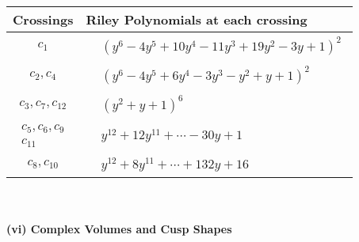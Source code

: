 \documentclass[1p]{elsarticle_modified}
\theoremstyle{definition}
\begin{document}
\begin{tabular}{m{50pt}|m{274pt}}
Crossings & \hspace{64pt}Riley Polynomials at each crossing \\
\hline $$\begin{aligned}c_{1}\end{aligned}$$&$\begin{aligned}
&(y^6-4 y^5+10 y^4-11 y^3+19 y^2-3 y+1)^2
\end{aligned}$\\
\hline $$\begin{aligned}c_{2},c_{4}\end{aligned}$$&$\begin{aligned}
&(y^6-4 y^5+6 y^4-3 y^3- y^2+y+1)^2
\end{aligned}$\\
\hline $$\begin{aligned}c_{3},c_{7},c_{12}\end{aligned}$$&$\begin{aligned}
&(y^2+y+1)^6
\end{aligned}$\\
\hline $$\begin{aligned}c_{5},c_{6},c_{9}\\c_{11}\end{aligned}$$&$\begin{aligned}
&y^{12}+12 y^{11}+\cdots-30 y+1
\end{aligned}$\\
\hline $$\begin{aligned}c_{8},c_{10}\end{aligned}$$&$\begin{aligned}
&y^{12}+8 y^{11}+\cdots+132 y+16
\end{aligned}$\\
\hline
\end{tabular}\\~\\
\newpage\flushleft \textbf{(vi) Complex Volumes and Cusp Shapes}
\end{document}
